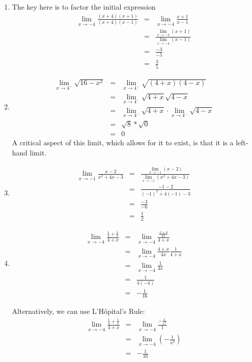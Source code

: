 \documentclass[12pt]{article}
\begin{document}
\begin{enumerate}
\item
The key here is to factor the initial expression\\
\begin{eqnarray*}
 \lim_{x \to -4} \frac{(x+4)(x+1)}{(x+4)(x-1)} &=& \lim_{x \to -4} \frac{x+1}{x-1}\\
 &=& \frac{\lim_{x \to -4}(x+1)}{\lim_{x \to -4}(x-1)} \\
 &=& \frac{-3}{-5}\\
 &=& \frac{3}{5}
\end{eqnarray*}
\item
\begin{eqnarray*}
\lim_{x \to 4^{-}} \sqrt{16 - x^2} &=& \lim_{x \to 4^{-}} \sqrt{(4+x)(4-x)}\\
&=& \lim_{x \to 4^{-}} \sqrt{4+x} \sqrt{4-x}\\
&=& \lim_{x \to 4^{-}}\sqrt{4+x} \cdot \lim_{x \to 4^{-}}\sqrt{4-x}\\
&=&\sqrt{8} * \sqrt{0}\\
&=& 0
\end{eqnarray*}
A critical aspect of this limit, which allows for it to exist, is that it is a left-hand limit. 
\item \begin{eqnarray*} \lim_{x \to -1} \frac{x-2}{x^2 + 4x -3} &=& \frac{\lim_{x \to -1} (x-2)}{\lim_{x \to -1} (x^2 + 4x -3)}\\
&=& \frac{-1 - 2}{(-1)^2 + 4(-1) - 3}\\
&=& \frac{-3}{-6}\\
&=& \frac{1}{2}
\end{eqnarray*}

\item
\begin{eqnarray*}
 \lim_{x \to -4} \frac{\frac{1}{4} + \frac{1}{x}}{4 + x} &=&  \lim_{x \to -4} \frac{ \frac{x+4}{4x}}{4+x}\\
&=& \lim_{x \to -4} \frac{4+x}{4x} \frac{1}{4+x}\\
&=& \lim_{x \to -4} \frac{1}{4x}\\
&=& \frac{1}{4(-4)}\\
&=& -\frac{1}{16}
\end{eqnarray*}

Alternatively, we can use L'H\^{o}pital's Rule:
\begin{eqnarray*}
 \lim_{x \to -4} \frac{\frac{1}{4} + \frac{1}{x}}{4 + x} &=&  \lim_{x \to -4} \frac{ -\frac{1}{x^2}}{1} \\
&=&  \lim_{x \to -4} (-\frac{1}{x^2})\\
&=& -\frac{1}{16}
\end{eqnarray*}

\end{enumerate}
\end{document}
